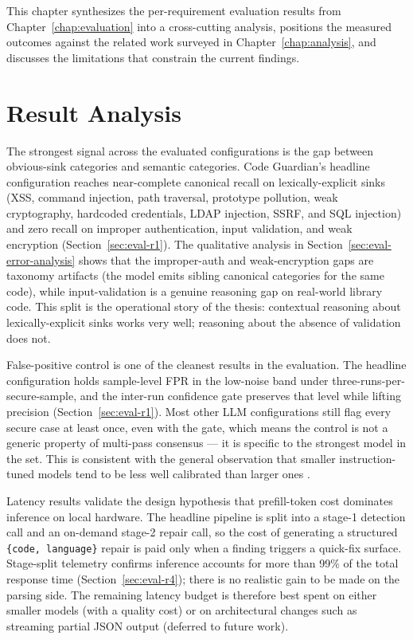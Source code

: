 This chapter synthesizes the per-requirement evaluation results from Chapter~\ref{chap:evaluation} into a cross-cutting analysis, positions the measured outcomes against the related work surveyed in Chapter~\ref{chap:analysis}, and discusses the limitations that constrain the current findings.

\section{Result Analysis}

The strongest signal across the evaluated configurations is the gap between obvious-sink categories and semantic categories. Code Guardian's headline configuration reaches near-complete canonical recall on lexically-explicit sinks (XSS, command injection, path traversal, prototype pollution, weak cryptography, hardcoded credentials, LDAP injection, SSRF, and SQL injection) and zero recall on improper authentication, input validation, and weak encryption (Section~\ref{sec:eval-r1}). The qualitative analysis in Section~\ref{sec:eval-error-analysis} shows that the improper-auth and weak-encryption gaps are taxonomy artifacts (the model emits sibling canonical categories for the same code), while input-validation is a genuine reasoning gap on real-world library code. This split is the operational story of the thesis: contextual reasoning about lexically-explicit sinks works very well; reasoning about the absence of validation does not.

False-positive control is one of the cleanest results in the evaluation. The headline configuration holds sample-level FPR in the low-noise band under three-runs-per-secure-sample, and the inter-run confidence gate preserves that level while lifting precision (Section~\ref{sec:eval-r1}). Most other LLM configurations still flag every secure case at least once, even with the gate, which means the control is not a generic property of multi-pass consensus --- it is specific to the strongest model in the set. This is consistent with the general observation that smaller instruction-tuned models tend to be less well calibrated than larger ones \cite{ji2023hallucination}.

Latency results validate the design hypothesis that prefill-token cost dominates inference on local hardware. The headline pipeline is split into a stage-1 detection call and an on-demand stage-2 repair call, so the cost of generating a structured \texttt{\{code, language\}} repair is paid only when a finding triggers a quick-fix surface. Stage-split telemetry confirms inference accounts for more than 99\% of the total response time (Section~\ref{sec:eval-r4}); there is no realistic gain to be made on the parsing side. The remaining latency budget is therefore best spent on either smaller models (with a quality cost) or on architectural changes such as streaming partial JSON output (deferred to future work).


